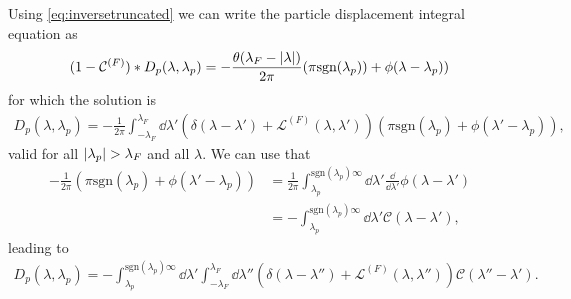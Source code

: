 \documentclass[11pt, a4paper]{report} %
\begin{document}
Using \cref{eq:inversetruncated} we can write the particle displacement integral equation as 
\begin{align}
  \label{eq:33}
  (1 - \mathcal{C}^{(F)}) * D_p(\lambda, \lambda_p) = -\frac{\theta(\lambda_F-\abs{\lambda})}{2\pi} (\pi\textrm{sgn}(\lambda_p)) + \phi(\lambda-\lambda_p))
\end{align}
for which the solution is 
\begin{align}
  \label{eq:34}
  D_p(\lambda,\lambda_p) = -\frac{1}{2\pi} \int_{-\lambda_F}^{\lambda_F} \dd \lambda' \left(\delta(\lambda-\lambda') + \mathcal{L}^{(F)}(\lambda,\lambda') \right)(\pi \mathrm{sgn}(\lambda_p) + \phi(\lambda'-\lambda_p)),
\end{align}
valid for all \(\abs{\lambda_p}>\lambda_F\) and all \(\lambda\).
We can use that
\begin{align}
  \label{eq:35}
  -\frac{1}{2\pi}(\pi \mathrm{sgn}(\lambda_p) + \phi(\lambda'-\lambda_p)) &= \frac{1}{2\pi} \int_{\lambda_p}^{\mathrm{sgn}(\lambda_p)\infty} \dd \lambda' \frac{\dd}{\dd\lambda'} \phi(\lambda-\lambda') \\
                                                                          &= - \int_{\lambda_p}^{\mathrm{sgn}(\lambda_p)\infty}\dd \lambda' \mathcal{C}(\lambda-\lambda'),
\end{align}
leading to~\cite{Caux2015}
\begin{align}
  \label{eq:particledisplacement}
  	D_p(\lambda, \lambda_p) = - \int_{\lambda_p}^{\textrm{sgn}(\lambda_p)\infty} \dd \lambda' \int_{-\lambda_F}^{\lambda_F} \dd  \lambda'' \left(\delta(\lambda-\lambda'') + \mathcal{L}^{(F)}(\lambda,\lambda'') \right)\mathcal{C}(\lambda''-\lambda').
\end{align}
\end{document}
